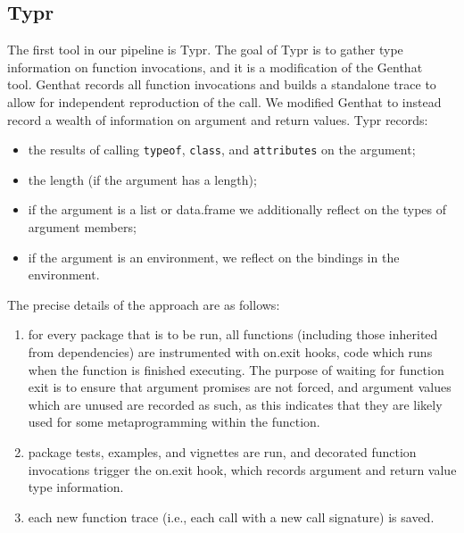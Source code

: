 \documentclass[sigplan,10pt,review,anonymous]{acmart}\settopmatter{printfolios=true,printccs=false,printacmref=false}
\begin{document}
%
%
%
%
\subsection{Typr}


The first tool in our pipeline is Typr.
The goal of Typr is to gather type information on function invocations, and it is a modification of the Genthat~\cite{issta18} tool.
Genthat records all function invocations and builds a standalone trace to allow for independent reproduction of the call. 
We modified Genthat to instead record a wealth of information on argument and return values.
Typr records:

\begin{itemize}
\item the results of calling {\tt typeof}, {\tt class}, and {\tt attributes} on the argument;
\item the length (if the argument has a length);
\item if the argument is a list or data.frame we additionally reflect on the types of argument members;
\item if the argument is an environment, we reflect on the bindings in the environment.
\end{itemize}

The precise details of the approach are as follows:

\begin{enumerate}
\item for every package that is to be run, all functions (including those inherited from dependencies) are instrumented with on.exit hooks, code which runs when the function is finished executing.
The purpose of waiting for function exit is to ensure that argument promises are not forced, and argument values which are unused are recorded as such, as this indicates that they are likely used for some metaprogramming within the function.
\item package tests, examples, and vignettes are run, and decorated function invocations trigger the on.exit hook, which records argument and return value type information.
\item each new function trace (i.e., each call with a new call signature) is saved.
\end{enumerate}

\end{document}

